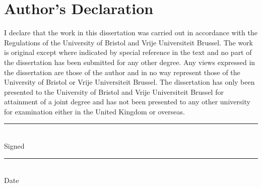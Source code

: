 \chapter*{Author's Declaration}
I declare that the work in this dissertation was carried out in accordance
with the Regulations of the University of Bristol and Vrije Universiteit Brussel.
The work is original
except where indicated by special reference in the text and no part of the
dissertation has been submitted for any other degree. Any views expressed
in the dissertation are those of the author and in no way represent those of
the University of Bristol or Vrije Universiteit Brussel. The dissertation has only been presented to the
University of Bristol and Vrije Universiteit Brussel for attainment of a joint degree and has not been presented to any
other university for examination either in the United Kingdom or overseas.


\vspace{3cm}
\parbox{\textwidth}{
    \parbox{7cm}{
      \centering
      \rule{6cm}{1pt}\\
       Signed 
    }
    \hfill
    \parbox{7cm}{
      \centering
      \rule{6cm}{1pt}\\
      Date
    }
  }
